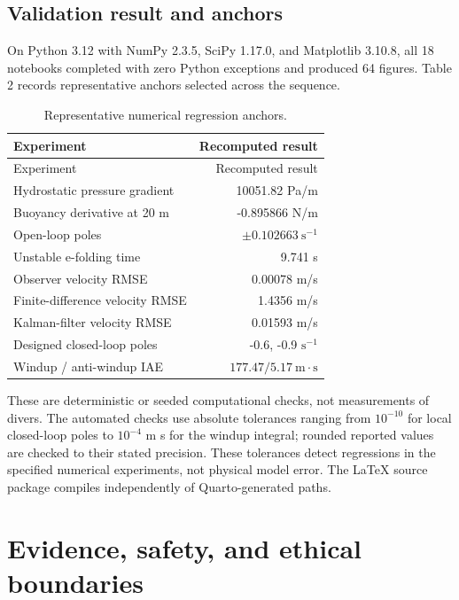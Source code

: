 \documentclass[
]{article}
\begin{document}
\hypertarget{validation-result-and-anchors}{%
\subsection{Validation result and
anchors}\label{validation-result-and-anchors}}

On Python 3.12 with NumPy 2.3.5, SciPy 1.17.0, and Matplotlib 3.10.8,
all 18 notebooks completed with zero Python exceptions and produced 64
figures. Table 2 records representative anchors selected across the
sequence.

\begin{longtable}[]{@{}lr@{}}
\caption{Representative numerical regression anchors.}\tabularnewline
\toprule\noalign{}
Experiment & Recomputed result \\
\midrule\noalign{}
\endfirsthead
\toprule\noalign{}
Experiment & Recomputed result \\
\midrule\noalign{}
\endhead
\bottomrule\noalign{}
\endlastfoot
Hydrostatic pressure gradient & 10051.82 Pa/m \\
Buoyancy derivative at 20 m & -0.895866 N/m \\
Open-loop poles & \(\pm0.102663\ \mathrm{s^{-1}}\) \\
Unstable e-folding time & 9.741 s \\
Observer velocity RMSE & 0.00078 m/s \\
Finite-difference velocity RMSE & 1.4356 m/s \\
Kalman-filter velocity RMSE & 0.01593 m/s \\
Designed closed-loop poles & -0.6, -0.9 \(\mathrm{s^{-1}}\) \\
Windup / anti-windup IAE & \(177.47 / 5.17\ \mathrm{m\cdot s}\) \\
\end{longtable}

These are deterministic or seeded computational checks, not measurements
of divers. The automated checks use absolute tolerances ranging from
\(10^{-10}\) for local closed-loop poles to \(10^{-4}\) m s for the
windup integral; rounded reported values are checked to their stated
precision. These tolerances detect regressions in the specified
numerical experiments, not physical model error. The LaTeX source
package compiles independently of Quarto-generated paths.

\hypertarget{evidence-safety-and-ethical-boundaries}{%
\section{Evidence, safety, and ethical
boundaries}\label{evidence-safety-and-ethical-boundaries}}
\end{document}
